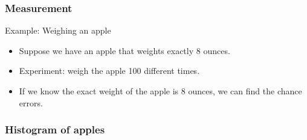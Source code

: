 \documentclass[handout]{beamer}
\begin{document}

   \begin{frame} \frametitle{Measurement}

   \begin{block}
   {Example: Weighing an apple}
   \begin{itemize}
   \item Suppose we have an apple that weights exactly 8 ounces.
   \item Experiment: weigh the apple 100 different times.
   \item If we know the exact weight of the apple is 8 ounces,
   we can find the chance errors.
   \end{itemize}
   \end{block}
   \end{frame}



   \begin{frame}
   \frametitle{Histogram of apples}
   \begin{center}
   \end{center}

   \end{frame}

\end{document}
